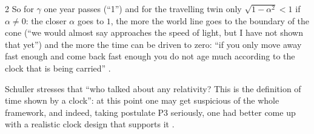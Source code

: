 \begin{paracol}{2}
So for $\gamma$ one year passes (``1'') and for the travelling twin only $\sqrt{1-\alpha^2}<1$ if $\alpha\neq0$: the closer $\alpha$ goes to $1$, the more the world line goes to the boundary of the cone (``we would almost say approaches the speed of light, but I have not shown that yet'') and the more the time can be driven to zero: ``if you only move away fast enough and come back fast enough you do not age much according to the clock that is being carried'' .

Schuller stresses that ``who talked about any relativity? This is the definition of time shown by a clock'': at this point one may get suspicious of the whole framework, and indeed, taking postulate P3 seriously, one had better come up with a realistic clock design that supports it .


\end{paracol}
